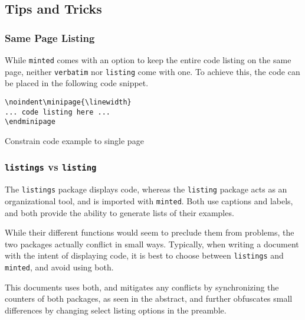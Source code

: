 
\subsection{Tips and Tricks}

\subsubsection{Same Page Listing}

While \verb|minted| comes with an option to keep the entire code listing on the same page, neither \verb|verbatim| nor \verb|listing| come with one. To achieve this, the code can be placed in the following code snippet.

\begin{listing}[H]
\begin{verbatim}
\noindent\minipage{\linewidth}
... code listing here ...
\endminipage
\end{verbatim}
\caption[Samepage Trick]{Constrain code example to single page}
\label{code:latex:same_page}
\end{listing}

\subsubsection{\texttt{listings} vs \texttt{listing}}

The \verb|listings| package displays code, whereas the \verb|listing| package acts as an organizational tool, and is imported with \verb|minted|. Both use captions and labels, and both provide the ability to generate lists of their examples.

While their different functions would seem to preclude them from problems, the two packages actually conflict in small ways. Typically, when writing a document with the intent of displaying code, it is best to choose between \verb|listings| and \verb|minted|, and avoid using both.

This documents uses both, and mitigates any conflicts by synchronizing the counters of both packages, as seen in the abstract, and further obfuscates small differences by changing select listing options in the preamble.

\newpage